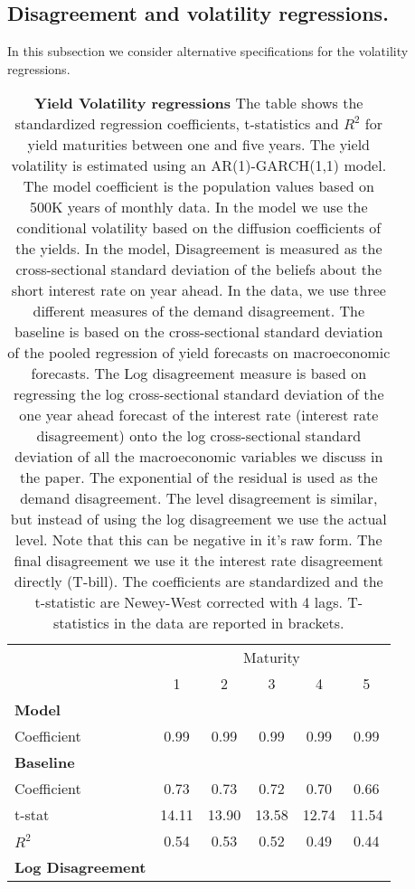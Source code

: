 \subsection{Disagreement and volatility regressions.}
In this subsection we consider alternative specifications for the volatility regressions. 
\begin{table}[H]
\centering
\caption{\textbf{Yield Volatility regressions} The table shows the standardized regression coefficients, t-statistics and $R^2$ for yield maturities between one and five years. The yield volatility is estimated using an AR(1)-GARCH(1,1) model. The model coefficient is the population values based on 500K years of monthly data. In the model we use the conditional volatility based on the diffusion coefficients of the yields. In the model, Disagreement is measured as the cross-sectional standard deviation of the beliefs about the short interest rate on year ahead. In the data, we use three different measures of the demand disagreement. The baseline is based on the cross-sectional standard deviation of the pooled regression of yield forecasts on macroeconomic forecasts. The Log disagreement measure is based on regressing the log cross-sectional standard deviation of the one year ahead forecast of the interest rate (interest rate disagreement) onto the log cross-sectional standard deviation of all the macroeconomic variables we discuss in the paper. The exponential of the residual is used as the demand disagreement. The level disagreement is similar, but instead of using the log disagreement we use the actual level. Note that this can be negative in it's raw form. The final disagreement we use it the interest rate disagreement directly (T-bill). The coefficients are standardized and the t-statistic are Newey-West corrected with 4 lags. T-statistics in the data are reported in brackets.}
\begin{tabular}{lccccc}
\hline
\hline
& \multicolumn{5}{c}{Maturity} \\
& 1 & 2 & 3 & 4 & 5 \\
\hline
\textbf{Model} \\
Coefficient & 0.99 & 0.99 & 0.99 & 0.99 & 0.99 \\
\hline
\textbf{Baseline} \\
Coefficient & 0.73 & 0.73 & 0.72 & 0.70 & 0.66 \\
t-stat & 14.11 & 13.90 & 13.58 & 12.74 & 11.54 \\
$R^2$ & 0.54 & 0.53 & 0.52 & 0.49 & 0.44 \\
\hline
\textbf{Log Disagreement} \\

\end{tabular}
\end{table}
